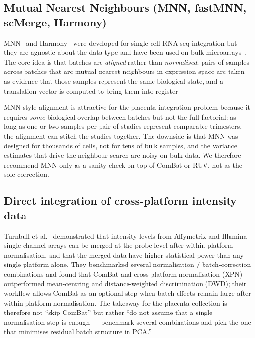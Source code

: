 \documentclass[11pt,a4paper]{article}
\begin{document}
\subsection{Mutual Nearest Neighbours (MNN, fastMNN, scMerge, Harmony)}

MNN~\cite{haghverdi2018} and Harmony~\cite{korsunsky2019} were
developed for single-cell RNA-seq integration but they are agnostic
about the data type and have been used on bulk
microarrays~\cite{varma2020}. The core idea is that batches are
\emph{aligned} rather than \emph{normalised}: pairs of samples
across batches that are mutual nearest neighbours in expression
space are taken as evidence that those samples represent the same
biological state, and a translation vector is computed to bring
them into register.

MNN-style alignment is attractive for the placenta integration
problem because it requires \emph{some} biological overlap between
batches but not the full factorial: as long as one or two samples
per pair of studies represent comparable trimesters, the alignment
can stitch the studies together. The downside is that MNN was
designed for thousands of cells, not for tens of bulk samples, and
the variance estimates that drive the neighbour search are noisy
on bulk data. We therefore recommend MNN only as a sanity check on
top of ComBat or RUV, not as the sole correction.

\subsection{Direct integration of cross-platform intensity data}

Turnbull et al.~\cite{turnbull2012} demonstrated that intensity
levels from Affymetrix and Illumina single-channel arrays can be
merged at the probe level after within-platform normalisation, and
that the merged data have higher statistical power than any single
platform alone. They benchmarked several normalisation /
batch-correction combinations and found that ComBat and
cross-platform normalisation (XPN) outperformed mean-centring and
distance-weighted discrimination (DWD); their workflow allows
ComBat as an optional step when batch effects remain large after
within-platform normalisation. The takeaway for the placenta
collection is therefore not ``skip ComBat'' but rather ``do not
assume that a single normalisation step is enough --- benchmark
several combinations and pick the one that minimises residual
batch structure in PCA.''
\end{document}
